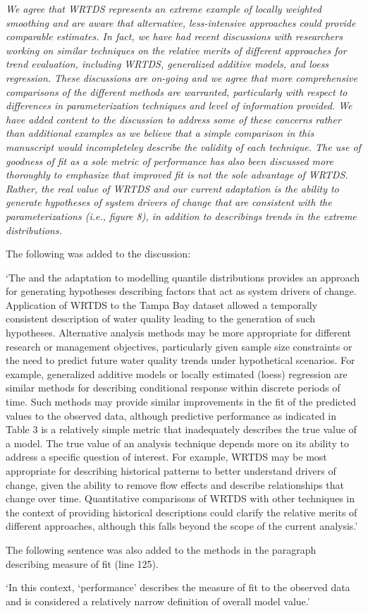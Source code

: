 \documentclass[letterpaper,12pt,oneside]{article}\usepackage[]{graphicx}\usepackage[]{color}
\begin{document}
{\it We agree that WRTDS represents an extreme example of locally weighted smoothing and are aware that alternative, less-intensive approaches could provide comparable estimates.  In fact, we have had recent discussions with researchers working on similar techniques on the relative merits of different approaches for trend evaluation, including WRTDS, generalized additive models, and loess regression.  These discussions are on-going and we agree that more comprehensive comparisons of the different methods are warranted, particularly with respect to differences in parameterization techniques and level of information provided.  We have added content to the discussion to address some of these concerns rather than additional examples as we believe that a simple comparison in this manuscript would incompleteley describe the validity of each technique.  The use of goodness of fit as a sole metric of performance has also been discussed more thoroughly to emphasize that improved fit is not the sole advantage of WRTDS.  Rather, the real value of WRTDS and our current adaptation is the ability to generate hypotheses of system drivers of change that are consistent with the parameterizations (i.e., figure 8), in addition to describings trends in the extreme distributions.  

The following was added to the discussion:

`The  and the adaptation to modelling quantile distributions provides an approach for generating hypotheses describing factors that act as system drivers of change.  Application of \ac{WRTDS} to the Tampa Bay dataset allowed a temporally consistent description of water quality leading to the generation of such hypotheses.  Alternative analysis methods may be more appropriate for different research or management objectives, particularly given sample size constraints or the need to predict future water quality trends under hypothetical scenarios.  For example, generalized additive models or locally estimated (loess) regression are similar methods for describing conditional response within discrete periods of time.  Such methods may provide similar improvements in the fit of the predicted values to the observed data, although predictive performance as indicated in Table 3 is a relatively simple metric that inadequately describes the true value of a model. The true value of an analysis technique depends more on its ability to address a specific question of interest.  For example, \ac{WRTDS} may be most appropriate for describing historical patterns to better understand drivers of change, given the ability to remove flow effects and describe relationships that change over time.  Quantitative comparisons of \ac{WRTDS} with other techniques in the context of providing historical descriptions could clarify the relative merits of different approaches, although this falls beyond the scope of the current analysis.'

The following sentence was also added to the methods in the paragraph describing measure of fit (line 125).  

`In this context, `performance' describes the measure of fit to the observed data and is considered a relatively narrow definition of overall model value.'
}
\end{document}
